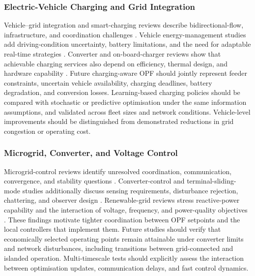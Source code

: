 \documentclass[a4paper,fleqn]{cas-sc}
\begin{document}
    \subsubsection{Electric-Vehicle Charging and Grid Integration}\label{subsubsec:gaps_ev}
    
    Vehicle--grid integration and smart-charging reviews describe bidirectional-flow, infrastructure, and coordination challenges \cite{opfRef029,sadeghian2022comprehensive}. Vehicle energy-management studies add driving-condition uncertainty, battery limitations, and the need for adaptable real-time strategies \cite{opfRef028,opfRef048,opfRef063}. Converter and on-board-charger reviews show that achievable charging services also depend on efficiency, thermal design, and hardware capability \cite{safayatullah2022comprehensive,opfRef077}. Future charging-aware OPF should jointly represent feeder constraints, uncertain vehicle availability, charging deadlines, battery degradation, and conversion losses. Learning-based charging policies should be compared with stochastic or predictive optimisation under the same information assumptions, and validated across fleet sizes and network conditions. Vehicle-level improvements should be distinguished from demonstrated reductions in grid congestion or operating cost.
    
    \subsubsection{Microgrid, Converter, and Voltage Control}\label{subsubsec:gaps_microgrid_control}
    
    Microgrid-control reviews identify unresolved coordination, communication, convergence, and stability questions \cite{opfRef030,shirkhani2023review}. Converter-control and terminal-sliding-mode studies additionally discuss sensing requirements, disturbance rejection, chattering, and observer design \cite{opfRef074,opfRef075}. Renewable-grid reviews stress reactive-power capability and the interaction of voltage, frequency, and power-quality objectives \cite{opfRef047,opfRef055}. These findings motivate tighter coordination between OPF setpoints and the local controllers that implement them. Future studies should verify that economically selected operating points remain attainable under converter limits and network disturbances, including transitions between grid-connected and islanded operation. Multi-timescale tests should explicitly assess the interaction between optimisation updates, communication delays, and fast control dynamics.
    
\end{document}
